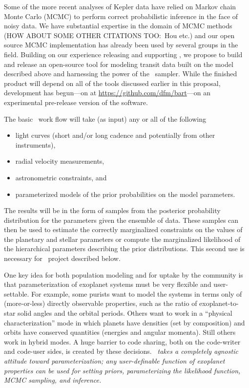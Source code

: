 \documentclass[letterpaper,12pt,preprint]{hack_aastex}
\newcommand{\Bart}{\package{Bart}}
\newcommand{\emcee}{\package{emcee}}
\newcommand{\TheCreator}{\package{TheCreator}}
\begin{document}
Some of the more recent analyses of Kepler data have relied on Markov chain
Monte Carlo (MCMC) to perform correct probabilistic inference in the face of
noisy data.
We have substantial expertise in the domain of MCMC methods \citep{emcee} (HOW
ABOUT SOME OTHER CITATIONS TOO:\ Hou etc.) and our open source MCMC
implementation has already been used by several groups in the field.
Building on our experience releasing and supporting \emcee, we propose to
build and release an open-source tool for modeling transit data built on the
model described above and harnessing the power of the \emcee\ sampler.
While the finished product will depend on all of the tools discussed earlier
in this proposal, development has begun---on  at
\url{https://github.com/dfm/bart}---on an experimental pre-release version of
the software.

The basic \Bart\ work flow will take (as input) any or all of the following
\begin{itemize}
\item light curves (short and/or long cadence and potentially from other
instruments),
\item radial velocity measurements,
\item astronometric constraints, and
\item parameterized models of the prior probabilities on the model parameters.
\end{itemize}
The results will be in the form of samples from the posterior probability
distribution for the parameters given the ensemble of data.
These samples can then be used to estimate the correctly marginalized
constraints on the values of the planetary and stellar parameters or compute
the marginalized likelihood of the hierarchical parameters describing the
prior distributions.
This second use is necessary for \TheCreator\ project described below.

One key idea for both population modeling and for uptake by the
community is that parameterization of exoplanet systems must be very
flexible and user-settable.  For example, some purists want to model
the systems in terms only of (more-or-less) directly observable
properties, such as the ratio of exoplanet-to-star solid angles and
the orbital periods.  Others want to work in a ``physical
characterization'' mode in which planets have densities (set by
composition) and orbits have conserved quantities (energies and
angular momenta).  Still others work in hybrid modes.  A huge barrier
to code sharing, both on the code-writer and code-user sides, is
created by these decisions.  \emph{\Bart\ takes a completely agnostic
attitude toward parameterization; any user-definable function of
exoplanet properties can be used for setting priors, parameterizing
the likelihood function, MCMC sampling, and inference.}
\end{document}

